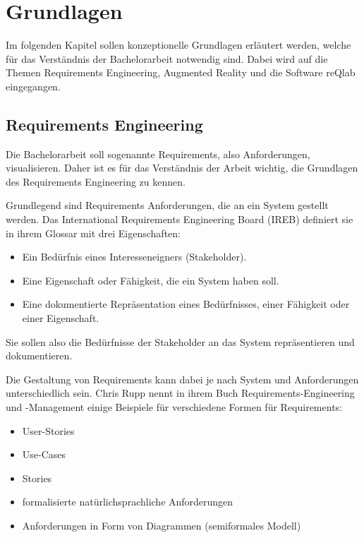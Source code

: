 \chapter{Grundlagen}

Im folgenden Kapitel sollen konzeptionelle Grundlagen erläutert werden, welche für das Verständnis der Bachelorarbeit notwendig sind.
Dabei wird auf die Themen Requirements Engineering, Augmented Reality und die Software reQlab eingegangen.

  \section{Requirements Engineering}
  Die Bachelorarbeit soll sogenannte Requirements, also Anforderungen, visualisieren.
  Daher ist es für das Verständnis der Arbeit wichtig, die Grundlagen des Requirements Engineering zu kennen.


    Grundlegend sind Requirements Anforderungen, die an ein System gestellt werden.
    Das International Requirements Engineering Board (IREB) definiert sie in ihrem Glossar mit drei Eigenschaften:
    \begin{itemize}
        \item Ein Bedürfnis eines Interesseneigners (Stakeholder).
        \item Eine Eigenschaft oder Fähigkeit, die ein System haben soll.
        \item Eine dokumentierte Repräsentation eines Bedürfnisses, einer Fähigkeit oder einer Eigenschaft.
    \end{itemize}
    \autocite[][Def. Anforderung]{ireb_cpre_glossary}

    Sie sollen also die Bedürfnisse der Stakeholder an das System repräsentieren und dokumentieren.

    Die Gestaltung von Requirements kann dabei je nach System und Anforderungen unterschiedlich sein. Chris Rupp nennt in ihrem Buch \glqq{}Requirements-Engineering und -Management\grqq{} einige Beispiele für verschiedene Formen für Requirements:
    \begin{itemize}
        \item User-Stories
        \item Use-Cases
        \item Stories
        \item formalisierte natürlichsprachliche Anforderungen
        \item Anforderungen in Form von Diagrammen (semiformales Modell)
    \end{itemize}
    \autocite[][S. 19]{Rupp2014}

